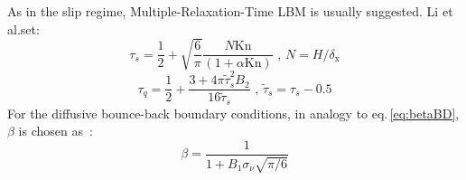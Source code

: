 As in the slip regime, Multiple-Relaxation-Time LBM is usually suggested. Li et al.\@ set:
\begin{equation}
 \tau_s = \frac{1}{2} + \sqrt{\frac{6}{\pi}} \frac{N \mathrm{Kn}}{(1+\alpha \mathrm{Kn})} \textrm{ , \ } N=H/\delta_\mathrm{x}
\end{equation}
\begin{equation}
 \tau_q = \frac{1}{2} + \frac{3 + 4 \pi \tilde{\tau}_s^2 B_2}{16 \tilde{\tau}_s } \textrm{ , \ } \tilde{\tau}_s = \tau_s - 0.5
\end{equation}
For the diffusive bounce-back boundary conditions, in analogy to eq.\,\ref{eq:betaBD},
$\beta$ is chosen as~\cite{Li2011}:
\begin{equation}
 \beta = \frac{1}{1 + B_1 \sigma_\nu \sqrt{\pi / 6}}
\end{equation}

